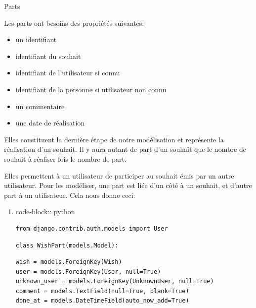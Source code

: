 \documentclass[11pt]{amsbook}
\newenvironment{sidebar}[1][r]
  {\wrapfigure{#1}{0.5\textwidth}\tcolorbox}
  {\endtcolorbox\endwrapfigure}
\begin{document}
\begin{sidebar}
Parts
\end{sidebar}

Les parts ont besoins des propriétés suivantes:


\begin{itemize}

\item un identifiant

\item identifiant du souhait

\item identifiant de l’utilisateur si connu

\item identifiant de la personne si utilisateur non connu

\item un commentaire

\item une date de réalisation

\end{itemize}


Elles constituent la dernière étape de notre modélisation et représente la réalisation d’un souhait. Il y aura autant de part d’un souhait que le nombre de souhait à réaliser fois le nombre de part.


Elles permettent à un utilisateur de participer au souhait émis par un autre utilisateur. Pour les modéliser, une part est liée d’un côté à un souhait, et d’autre part à un utilisateur. Cela nous donne ceci:


\begin{enumerate}

\item{code-block:: python}

\begin{verbatim}
from django.contrib.auth.models import User
\end{verbatim}

\begin{verbatim}
class WishPart(models.Model):
\end{verbatim}

\begin{verbatim}
wish = models.ForeignKey(Wish)
user = models.ForeignKey(User, null=True)
unknown_user = models.ForeignKey(UnknownUser, null=True)
comment = models.TextField(null=True, blank=True)
done_at = models.DateTimeField(auto_now_add=True)
\end{verbatim}
\end{enumerate}
\end{document}
